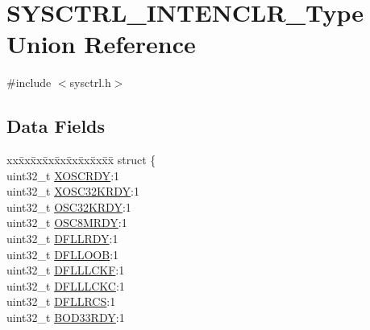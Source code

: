 \hypertarget{union_s_y_s_c_t_r_l___i_n_t_e_n_c_l_r___type}{}\section{S\+Y\+S\+C\+T\+R\+L\+\_\+\+I\+N\+T\+E\+N\+C\+L\+R\+\_\+\+Type Union Reference}
\label{union_s_y_s_c_t_r_l___i_n_t_e_n_c_l_r___type}


{\ttfamily \#include $<$sysctrl.\+h$>$}

\subsection*{Data Fields}
\begin{DoxyCompactItemize}
\item 
\begin{tabbing}
xx\=xx\=xx\=xx\=xx\=xx\=xx\=xx\=xx\=\kill
struct \{\\
\>uint32\_t \mbox{\hyperlink{union_s_y_s_c_t_r_l___i_n_t_e_n_c_l_r___type_ae3f4eaf046b9b3a9346c0d1d2d91cc06}{XOSCRDY}}:1\\
\>uint32\_t \mbox{\hyperlink{union_s_y_s_c_t_r_l___i_n_t_e_n_c_l_r___type_a8afcb31d4b37229559de2f9a205d8224}{XOSC32KRDY}}:1\\
\>uint32\_t \mbox{\hyperlink{union_s_y_s_c_t_r_l___i_n_t_e_n_c_l_r___type_ae7c0d69dbd8d57c9a1615479f6cc41e9}{OSC32KRDY}}:1\\
\>uint32\_t \mbox{\hyperlink{union_s_y_s_c_t_r_l___i_n_t_e_n_c_l_r___type_a6b0534423bae229796a1b7e1feef6929}{OSC8MRDY}}:1\\
\>uint32\_t \mbox{\hyperlink{union_s_y_s_c_t_r_l___i_n_t_e_n_c_l_r___type_a1edb42763dec361d286d7a22da8ac910}{DFLLRDY}}:1\\
\>uint32\_t \mbox{\hyperlink{union_s_y_s_c_t_r_l___i_n_t_e_n_c_l_r___type_a3a50f59df66d1c38f7bf4c0aa8c56efc}{DFLLOOB}}:1\\
\>uint32\_t \mbox{\hyperlink{union_s_y_s_c_t_r_l___i_n_t_e_n_c_l_r___type_aae17a5d3e587fb971abc5106079e77d0}{DFLLLCKF}}:1\\
\>uint32\_t \mbox{\hyperlink{union_s_y_s_c_t_r_l___i_n_t_e_n_c_l_r___type_ae19af414b302aae88bdb5c7bb986dd96}{DFLLLCKC}}:1\\
\>uint32\_t \mbox{\hyperlink{union_s_y_s_c_t_r_l___i_n_t_e_n_c_l_r___type_a4077d6d7cf1d872f4539d5d606472ab6}{DFLLRCS}}:1\\
\>uint32\_t \mbox{\hyperlink{union_s_y_s_c_t_r_l___i_n_t_e_n_c_l_r___type_a301491f5356d64c6590f374e8a876861}{BOD33RDY}}:1\\

\end{tabbing}
\end{DoxyCompactItemize}
